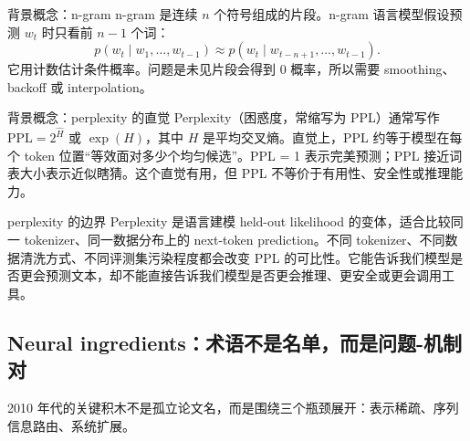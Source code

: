 \documentclass[a4paper]{article}
\begin{document}
\begin{importantbox}{背景概念：n-gram}
n-gram 是连续 \(n\) 个符号组成的片段。n-gram 语言模型假设预测 \(w_t\) 时只看前 \(n-1\) 个词：
\[
p(w_t\mid w_1,\ldots,w_{t-1})\approx p(w_t\mid w_{t-n+1},\ldots,w_{t-1}).
\]
它用计数估计条件概率。问题是未见片段会得到 0 概率，所以需要 smoothing、backoff 或 interpolation。
\end{importantbox}

\begin{knowledgebox}{背景概念：perplexity 的直觉}
Perplexity（困惑度，常缩写为 PPL）通常写作 \(\mathrm{PPL}=2^{\widehat H}\) 或 \(\exp(H)\)，其中 \(H\) 是平均交叉熵。直觉上，PPL 约等于模型在每个 token 位置“等效面对多少个均匀候选”。PPL = 1 表示完美预测；PPL 接近词表大小表示近似瞎猜。这个直觉有用，但 PPL 不等价于有用性、安全性或推理能力。
\end{knowledgebox}

\begin{warningbox}{perplexity 的边界}
Perplexity 是语言建模 held-out likelihood 的变体，适合比较同一 tokenizer、同一数据分布上的 next-token prediction。不同 tokenizer、不同数据清洗方式、不同评测集污染程度都会改变 PPL 的可比性。它能告诉我们模型是否更会预测文本，却不能直接告诉我们模型是否更会推理、更安全或更会调用工具。
\end{warningbox}

\subsection{Neural ingredients：术语不是名单，而是问题-机制对}

2010 年代的关键积木不是孤立论文名，而是围绕三个瓶颈展开：表示稀疏、序列信息路由、系统扩展。
\end{document}
